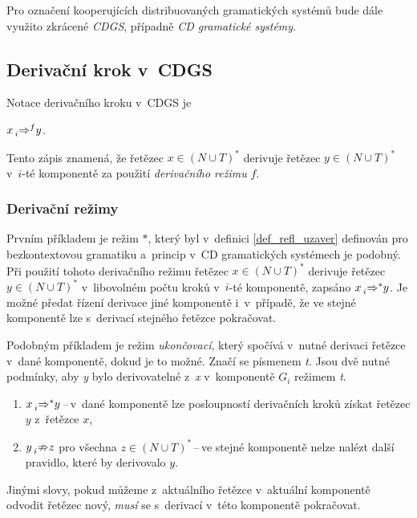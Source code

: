 \begin{convention}
    Pro označení kooperujících distribuovaných gramatických systémů bude dále využito zkrácené \emph{CDGS}, případně \emph{CD gramatické systémy}.
\end{convention}

\subsection*{Derivační krok v~CDGS}
Notace derivačního kroku v~CDGS je
\begin{center}
    $x \prescript{}{i}{\Rightarrow}^{f} y$.
\end{center}
Tento zápis znamená, že řetězec $x \in (N \cup T)^{*}$ derivuje řetězec $y \in (N \cup T)^{*}$ v~$i$-té komponentě za použití \emph{derivačního režimu} $f$.

\subsubsection*{Derivační režimy}

Prvním příkladem je režim $*$, který byl v~definici \ref{def_refl_uzaver} definován pro bezkontextovou gramatiku a~princip v~CD gramatických systémech je podobný.
Při použití tohoto derivačního režimu řetězec $x \in (N \cup T)^*$ derivuje řetězec $y \in (N \cup T)^*$ v~libovolném počtu kroků v~$i$-té komponentě, zapsáno $x \prescript{}{i}{\Rightarrow}^{*}y$.
Je možné předat řízení derivace jiné komponentě i~v~případě, že ve stejné komponentě lze s~derivací stejného řetězce pokračovat.

Podobným příkladem je režim \emph{ukončovací}, který spočívá v~nutné derivaci řetězce v~dané komponentě, dokud je to možné. Značí se písmenem \emph{t}. Jsou dvě nutné podmínky, aby \emph{y} bylo derivovatelné z~\emph{x} v~komponentě $G_i$ režimem \emph{t}.
\begin{enumerate}
    \item $x \prescript{}{i}{\Rightarrow}^{*} y$\,--\,v~dané komponentě lze posloupností derivačních kroků získat řetězec $y$ z~řetězce $x$,
    \item $y \prescript{}{i}{\nRightarrow} z$ pro všechna $z \in (N \cup T)^{*}$\,--\,ve stejné komponentě nelze nalézt další pravidlo, které by derivovalo $y$.
\end{enumerate}
Jinými slovy, pokud můžeme z~aktuálního řetězce v~aktuální komponentě odvodit řetězec nový, \emph{musí} se s~derivací v~této komponentě pokračovat. 

